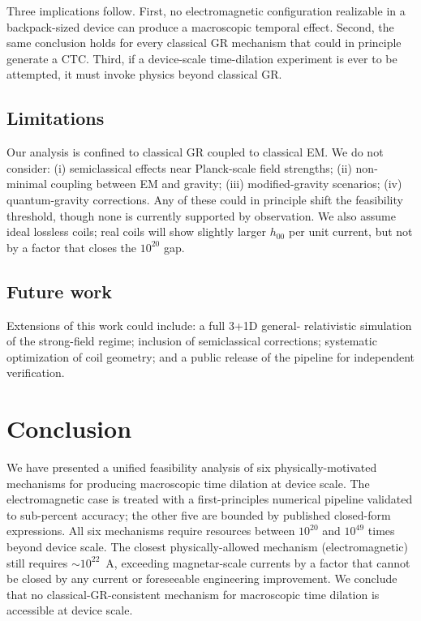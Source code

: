 \documentclass[11pt,a4paper,twocolumn]{article}
\begin{document}
Three implications follow. First, no electromagnetic configuration
realizable in a backpack-sized device can produce a macroscopic
temporal effect. Second, the same conclusion holds for every
classical GR mechanism that could in principle generate a CTC.
Third, if a device-scale time-dilation experiment is ever to be
attempted, it must invoke physics beyond classical GR.

\subsection{Limitations}
\label{subsec:limits}

Our analysis is confined to classical GR coupled to classical EM.
We do not consider: (i) semiclassical effects near Planck-scale
field strengths; (ii) non-minimal coupling between EM and gravity;
(iii) modified-gravity scenarios; (iv) quantum-gravity corrections.
Any of these could in principle shift the feasibility threshold,
though none is currently supported by observation. We also assume
ideal lossless coils; real coils will show slightly larger $h_{00}$
per unit current, but not by a factor that closes the $10^{20}$ gap.

\subsection{Future work}
\label{subsec:future}

Extensions of this work could include: a full 3+1D general-
relativistic simulation of the strong-field regime; inclusion of
semiclassical corrections; systematic optimization of coil
geometry; and a public release of the pipeline for independent
verification.

\section{Conclusion}
\label{sec:conclusion}

We have presented a unified feasibility analysis of six
physically-motivated mechanisms for producing macroscopic time
dilation at device scale. The electromagnetic case is treated
with a first-principles numerical pipeline validated to
sub-percent accuracy; the other five are bounded by published
closed-form expressions. All six mechanisms require resources
between $10^{20}$ and $10^{49}$ times beyond device scale.
The closest physically-allowed mechanism (electromagnetic) still
requires $\sim 10^{22}$~A, exceeding magnetar-scale currents by
a factor that cannot be closed by any current or foreseeable
engineering improvement. We conclude that no
classical-GR-consistent mechanism for macroscopic time dilation
is accessible at device scale.
\end{document}
